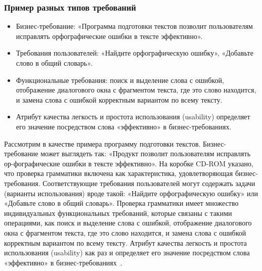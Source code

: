 \documentclass{../industrial-development}
\begin{document}
\begin{frame} \frametitle{Пример разных типов требований}
	\begin{itemize}
	\item \alert{Бизнес-требование}: «Программа подготовки текстов позволит пользователям исправлять орфографические ошибки в тексте эффективно».
	\item \alert{Требования пользователей}: «Найдите орфографическую ошибку», «Добавьте слово в общий словарь».
	\item \alert{Функциональные требования}: поиск и выделение слова с ошибкой, отображение диалогового окна с фрагментом текста, где это слово находится, и замена слова с ошибкой корректным вариантом по всему тексту.
	\item \alert{Атрибут качества} легкость и простота использования (usability) определяет его значение посредством слова «эффективно» в бизнес-требованиях.
	\end{itemize}
\end{frame}

\lecturenotes

Рассмотрим в качестве примера программу подготовки текстов. Бизнес-требование может выглядеть так: «Продукт позволит пользователям исправлять ор-фографические ошибки в тексте эффективно». На коробке CD-ROM указано, что проверка грамматики включена как характеристика, удовлетворяющая бизнес-требования. Соответствующие требования пользователей могут содержать задачи (варианты использования) вроде такой: «Найдите орфографическую ошибку» или «Добавьте слово в общий
словарь». Проверка грамматики имеет множество индивидуальных функциональных требований, которые связаны с такими операциями, как поиск и выделение слова с ошибкой, отображение диалогового окна
с фрагментом текста, где это слово находится, и замена слова с ошибкой корректным вариантом по всему тексту. Атрибут качества легкость и простота использования (usability) как раз и определяет его значение посредством слова «эффективно» в бизнес-требованиях~\cite[с.~10--11]{Wiegers}.


\end{document}
